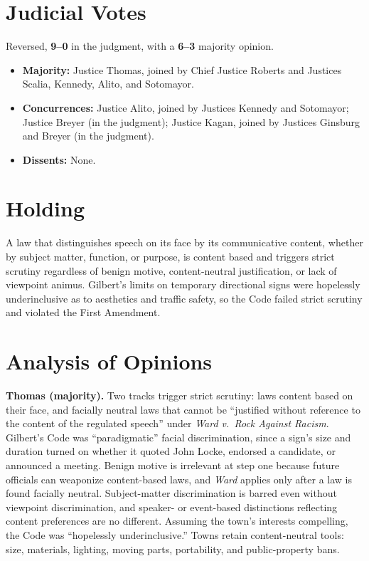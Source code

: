 \documentclass[12pt]{article}
\begin{document}
\section{Judicial Votes}

Reversed, \textbf{9--0} in the judgment, with a \textbf{6--3} majority opinion.
\begin{itemize}
\item \textbf{Majority:} Justice Thomas, joined by Chief Justice Roberts and Justices Scalia, Kennedy, Alito, and Sotomayor.
\item \textbf{Concurrences:} Justice Alito, joined by Justices Kennedy and Sotomayor; Justice Breyer (in the judgment); Justice Kagan, joined by Justices Ginsburg and Breyer (in the judgment).
\item \textbf{Dissents:} None.
\end{itemize}

\section{Holding}

A law that distinguishes speech on its face by its communicative content, whether by subject matter, function, or purpose, is content based and triggers strict scrutiny regardless of benign motive, content-neutral justification, or lack of viewpoint animus. Gilbert's limits on temporary directional signs were hopelessly underinclusive as to aesthetics and traffic safety, so the Code failed strict scrutiny and violated the First Amendment.

\section{Analysis of Opinions}

\textbf{Thomas (majority).} Two tracks trigger strict scrutiny: laws content based on their face, and facially neutral laws that cannot be ``justified without reference to the content of the regulated speech'' under \textit{Ward v.\ Rock Against Racism}. Gilbert's Code was ``paradigmatic'' facial discrimination, since a sign's size and duration turned on whether it quoted John Locke, endorsed a candidate, or announced a meeting. Benign motive is irrelevant at step one because future officials can weaponize content-based laws, and \textit{Ward} applies only after a law is found facially neutral. Subject-matter discrimination is barred even without viewpoint discrimination, and speaker- or event-based distinctions reflecting content preferences are no different. Assuming the town's interests compelling, the Code was ``hopelessly underinclusive.'' Towns retain content-neutral tools: size, materials, lighting, moving parts, portability, and public-property bans.
\end{document}
